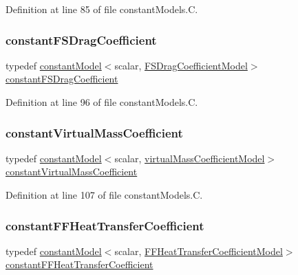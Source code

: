 Definition at line 85 of file constant\+Models.\+C.

\mbox{\label{namespaceFoam_a45a431a6ad4bd9b4663987ce40f64f3e}} 
\subsubsection{\texorpdfstring{constant\+F\+S\+Drag\+Coefficient}{constantFSDragCoefficient}}
{\footnotesize\ttfamily typedef \hyperlink{classFoam_1_1constantModel}{constant\+Model}$<$scalar, \hyperlink{classFoam_1_1FSDragCoefficientModel}{F\+S\+Drag\+Coefficient\+Model}$>$ \hyperlink{namespaceFoam_a45a431a6ad4bd9b4663987ce40f64f3e}{constant\+F\+S\+Drag\+Coefficient}}



Definition at line 96 of file constant\+Models.\+C.

\mbox{\label{namespaceFoam_a3ed635b90e17336f27203e329ff4691e}} 
\subsubsection{\texorpdfstring{constant\+Virtual\+Mass\+Coefficient}{constantVirtualMassCoefficient}}
{\footnotesize\ttfamily typedef \hyperlink{classFoam_1_1constantModel}{constant\+Model}$<$scalar, \hyperlink{classFoam_1_1virtualMassCoefficientModel}{virtual\+Mass\+Coefficient\+Model}$>$ \hyperlink{namespaceFoam_a3ed635b90e17336f27203e329ff4691e}{constant\+Virtual\+Mass\+Coefficient}}



Definition at line 107 of file constant\+Models.\+C.

\mbox{\label{namespaceFoam_a52ece67744a1564202ddbe77f715659e}} 
\subsubsection{\texorpdfstring{constant\+F\+F\+Heat\+Transfer\+Coefficient}{constantFFHeatTransferCoefficient}}
{\footnotesize\ttfamily typedef \hyperlink{classFoam_1_1constantModel}{constant\+Model}$<$scalar, \hyperlink{classFoam_1_1FFHeatTransferCoefficientModel}{F\+F\+Heat\+Transfer\+Coefficient\+Model}$>$ \hyperlink{namespaceFoam_a52ece67744a1564202ddbe77f715659e}{constant\+F\+F\+Heat\+Transfer\+Coefficient}}



